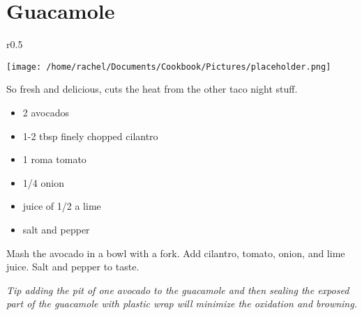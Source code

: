 \documentclass{article}
\begin{document}
\restoregeometry





\section*{\fontsize{25}{15}\selectfont Guacamole}



\begin{wrapfigure}{r}{0.5\textwidth}
\
  \begin{center}
 	\hfill\begin{minipage}{\textwidth}\centering
 	\vspace*{-6cm}
		\texttt{[image: /home/rachel/Documents/Cookbook/Pictures/placeholder.png]}
	\end{minipage}  
	\end{center}

\end{wrapfigure}



\vspace{5mm}

So fresh and delicious, cuts the heat from the other taco night stuff.
 
\vspace{5mm}
{\selectfont 
    \begin{itemize}[noitemsep]
    
      \item[] 2 avocados
      \item[] 1-2 tbsp finely chopped cilantro
      \item[] 1 roma tomato
      \item[] 1/4 onion
      \item[] juice of 1/2 a lime
      \item[] salt and pepper
           
    \end{itemize}
    }
\vspace{5mm}
    
Mash the avocado in a bowl with a fork. Add cilantro, tomato, onion, and lime juice. Salt and pepper to taste.

\textit{ Tip adding the pit of one avocado to the guacamole and then sealing the exposed part of the guacamole with plastic wrap will minimize the oxidation and browning.}
\end{document}
